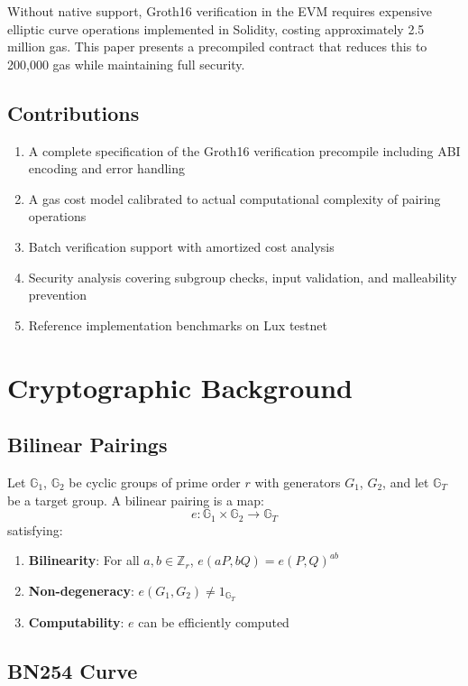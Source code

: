 \documentclass[11pt,a4paper]{article}
\theoremstyle{definition}
\begin{document}
Without native support, Groth16 verification in the EVM requires expensive elliptic curve operations implemented in Solidity, costing approximately 2.5 million gas. This paper presents a precompiled contract that reduces this to 200,000 gas while maintaining full security.

\subsection{Contributions}

\begin{enumerate}
    \item A complete specification of the Groth16 verification precompile including ABI encoding and error handling
    \item A gas cost model calibrated to actual computational complexity of pairing operations
    \item Batch verification support with amortized cost analysis
    \item Security analysis covering subgroup checks, input validation, and malleability prevention
    \item Reference implementation benchmarks on Lux testnet
\end{enumerate}

\section{Cryptographic Background}

\subsection{Bilinear Pairings}

Let $\mathbb{G}_1$, $\mathbb{G}_2$ be cyclic groups of prime order $r$ with generators $G_1$, $G_2$, and let $\mathbb{G}_T$ be a target group. A bilinear pairing is a map:
\[
e: \mathbb{G}_1 \times \mathbb{G}_2 \rightarrow \mathbb{G}_T
\]
satisfying:
\begin{enumerate}
    \item \textbf{Bilinearity}: For all $a, b \in \mathbb{Z}_r$, $e(aP, bQ) = e(P, Q)^{ab}$
    \item \textbf{Non-degeneracy}: $e(G_1, G_2) \neq 1_{\mathbb{G}_T}$
    \item \textbf{Computability}: $e$ can be efficiently computed
\end{enumerate}

\subsection{BN254 Curve}
\end{document}
